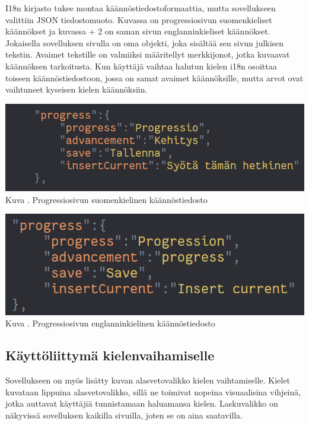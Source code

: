 \documentclass[11pt,a4paper,titlepage,oneside]{article}
\begin{document}
I18n kirjasto tukee montaa käännöstiedostoformaattia, mutta sovellukseen valittiin JSON tiedostomuoto.
Kuvassa \nextImageCount{} on progressiosivun suomenkieliset käännökset ja kuvassa {\the\numexpr \theimgCounter + 2 } on saman sivun englanninkieliset käännökset.
Jokaisella sovelluksen sivulla on oma objekti, joka sisältää sen sivun julkisen tekstin. 
Avaimet tekstille on valmiiksi määritellyt merkkijonot, jotka kuvaavat käännöksen tarkoitusta.
Kun käyttäjä vaihtaa halutun kielen i18n osoittaa toiseen käännöstiedostoon, 
jossa on samat avaimet käännöksille, mutta arvot ovat vaihtuneet kyseisen kielen käännöksiin.
\medskip


\bigskip
\includegraphics[width = 15cm]{src/public/oppar/translationfile.png}\\
Kuva \getImgCount. {} Progressiosivun suomenkielinen käännöstiedosto 
\medskip


\bigskip
\includegraphics[width = 15cm]{src/public/oppar/translationfileEng.png}\\
Kuva \getImgCount {}. Progressiosivun englanninkielinen käännöstiedosto
\medskip




\subsection{Käyttöliittymä kielenvaihamiselle}


Sovellukseen on myös lisätty kuvan \nextImageCount{} alasvetovalikko kielen vaihtamiselle. 
Kielet kuvataan lippuina alasvetovalikko,
sillä ne toimivat nopeina visuaalisina vihjeinä, jotka auttavat käyttäjiä tunnistamaan haluamansa kielen.
Laskuvalikko on näkyvissä sovelluksen kaikilla sivuilla, joten se on aina saatavilla.
\medskip
\end{document}
